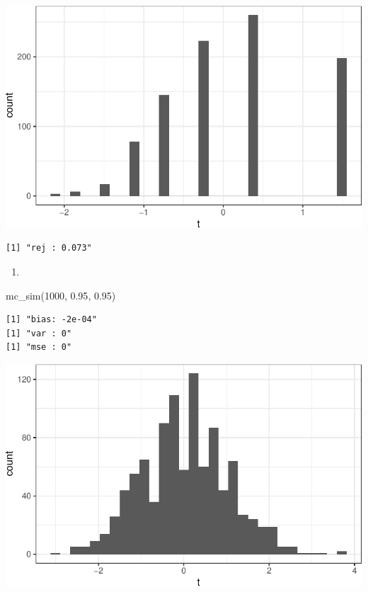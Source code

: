 \documentclass[
  letterpaper,
  DIV=11,
  numbers=noendperiod]{scrreprt}
\newenvironment{Shaded}{\begin{snugshade}}{\end{snugshade}}
\newcommand{\DecValTok}[1]{\textcolor[rgb]{0.68,0.00,0.00}{#1}}
\newcommand{\FloatTok}[1]{\textcolor[rgb]{0.68,0.00,0.00}{#1}}
\newcommand{\FunctionTok}[1]{\textcolor[rgb]{0.28,0.35,0.67}{#1}}
\newcommand{\NormalTok}[1]{\textcolor[rgb]{0.00,0.23,0.31}{#1}}
\providecommand{\tightlist}{%
  \setlength{\itemsep}{0pt}\setlength{\parskip}{0pt}}\usepackage{longtable,booktabs,array}
\begin{document}
\includegraphics{07-inference_files/figure-pdf/unnamed-chunk-16-1.pdf}

\begin{verbatim}
[1] "rej : 0.073"
\end{verbatim}

\begin{enumerate}
\def\labelenumi{\arabic{enumi}.}
\setcounter{enumi}{9}
\tightlist
\item
\end{enumerate}

\begin{Shaded}
\begin{Highlighting}[]
\FunctionTok{mc\_sim}\NormalTok{(}\DecValTok{1000}\NormalTok{, }\FloatTok{0.95}\NormalTok{, }\FloatTok{0.95}\NormalTok{)}
\end{Highlighting}
\end{Shaded}

\begin{verbatim}
[1] "bias: -2e-04"
[1] "var : 0"
[1] "mse : 0"
\end{verbatim}

\includegraphics{07-inference_files/figure-pdf/unnamed-chunk-17-1.pdf}
\end{document}
